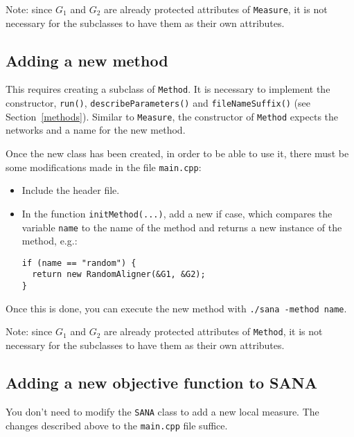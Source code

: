 \documentclass[]{article}
\begin{document}
Note: since $G_1$ and $G_2$ are already protected attributes of \texttt{Measure}, it is not necessary for the subclasses to have them as their own attributes.

\subsection{Adding a new method}
This requires creating a subclass of \texttt{Method}. It is necessary to implement the constructor, \texttt{run()}, \texttt{describeParameters()} and \texttt{fileNameSuffix()} (see Section~\ref{methods}). Similar to \texttt{Measure}, the constructor of \texttt{Method} expects the networks and a name for the new method.

Once the new class has been created, in order to be able to use it, there must be some modifications made in the file \texttt{main.cpp}:
\begin{itemize}
\item Include the header file.
\item In the function \texttt{initMethod(...)}, add a new if case, which compares the variable \texttt{name} to the name of the method and returns a new instance of the method, e.g.:
\begin{verbatim}
if (name == "random") {
  return new RandomAligner(&G1, &G2);
}
\end{verbatim}
\end{itemize}
Once this is done, you can execute the new method with \texttt{./sana -method name}.

Note: since $G_1$ and $G_2$ are already protected attributes of \texttt{Method}, it is not necessary for the subclasses to have them as their own attributes.

\subsection{Adding a new objective function to SANA}

You don't need to modify the \texttt{SANA} class to add a new local measure. The changes described above to the \texttt{main.cpp} file suffice.
\end{document}

